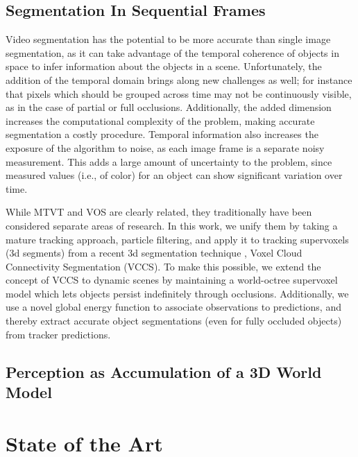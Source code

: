 \subsection{Segmentation In Sequential Frames}
Video segmentation has the potential to be more accurate than single image segmentation, as it can take advantage of the temporal coherence of objects in space to infer information about the objects in a scene. Unfortunately, the addition of the temporal domain brings along new challenges as well; for instance that pixels which should be grouped across time may not be continuously visible, as in the case of partial or full occlusions. Additionally, the added dimension increases the computational complexity of the problem, making accurate segmentation a costly procedure. Temporal information also increases the exposure of the algorithm to noise, as each image frame is a separate noisy measurement. This adds a large amount of uncertainty to the problem, since measured values (i.e., of color) for an object can show significant variation over time. 

While MTVT and VOS are clearly related, they traditionally have been considered separate areas of research. In this work, we unify them by taking a mature tracking approach, particle filtering, and apply it to tracking supervoxels (3d segments) from a recent 3d segmentation technique \cite{VCCS_Papon_2013}, Voxel Cloud Connectivity Segmentation (VCCS). To make this possible, we extend the concept of VCCS to dynamic scenes by maintaining a world-octree supervoxel model which lets objects persist indefinitely through occlusions. Additionally, we use a novel global energy function to associate observations to predictions, and thereby extract accurate object segmentations (even for fully occluded objects) from tracker predictions.

\subsection{Perception as Accumulation of a 3D World Model}

\section{State of the Art}
